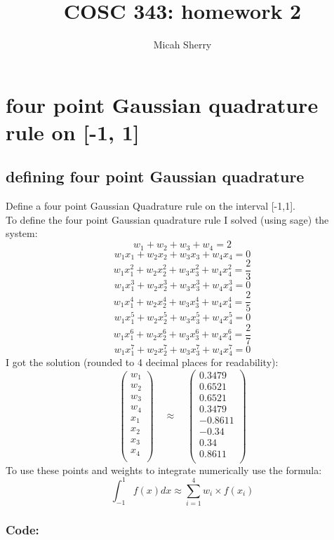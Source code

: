 \documentclass{article}
\title{COSC 343: homework 2}
\author{Micah Sherry}
\begin{document}
\maketitle
\section{four point Gaussian quadrature rule on [-1, 1]}
\subsection{defining four point Gaussian quadrature}
	Define a four point Gaussian Quadrature rule on the interval [-1,1].
	\\To define the four point Gaussian quadrature rule I solved (using sage) the system:
	$$ w_1 + w_2 + w_3 + w_4 = 2 $$
	$$ w_1x_1 + w_2x_2 + w_3x_3 + w_4x_4 = 0 $$
	$$ w_1x_1^2 + w_2x_2^2 + w_3x_3^2 + w_4x_4^2 = \frac{2}{3} $$
	$$ w_1x_1^3 + w_2x_2^3 + w_3x_3^3 + w_4x_4^3 = 0 $$
	$$ w_1x_1^4 + w_2x_2^4 + w_3x_3^4 + w_4x_4^4 = \frac{2}{5} $$
	$$ w_1x_1^5 + w_2x_2^5 + w_3x_3^5 + w_4x_4^5 = 0 $$
	$$ w_1x_1^6 + w_2x_2^6 + w_3x_3^6 + w_4x_4^6 = \frac{2}{7} $$
	$$ w_1x_1^7 + w_2x_2^7 + w_3x_3^7 + w_4x_4^7 = 0 $$
	I got the solution (rounded to 4 decimal places for readability):
	$$\begin{pmatrix}
		w_1 \\	w_2 \\	w_3 \\	w_4 \\	x_1 \\	x_2 \\	x_3 \\	x_4 \\
	\end{pmatrix}
	\quad \approx \quad
	\begin{pmatrix}
		0.3479 \\0.6521 \\0.6521 \\0.3479 \\-0.8611 \\-0.34\\0.34 \\0.8611 \\
	\end{pmatrix}$$
	To use these points and weights to integrate numerically use the formula:
	$$\int_{-1}^{1}f(x)dx \approx \sum_{i=1}^{4}w_i\times f(x_i)$$
	\subsubsection*{Code:}
		
\end{document}
